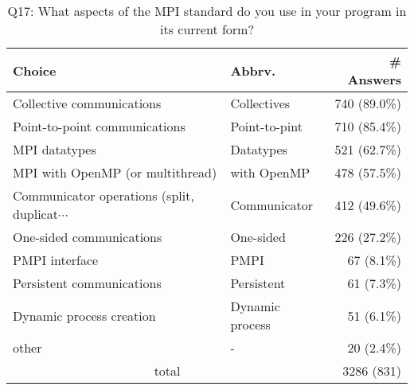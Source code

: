\begin{table}[htb]%
\begin{center}%
\caption{Q17: What aspects of the MPI standard do you use in your program in its current form?}%
\label{tab:Q17-ans}%
\begin{tabular}{l|l|r}%
\hline%
Choice & Abbrv. & \# Answers \\%
\hline%
Collective communications & Collectives & 740 (89.0\%) \\%
Point-to-point communications & Point-to-pint & 710 (85.4\%) \\%
MPI datatypes & Datatypes & 521 (62.7\%) \\%
MPI with OpenMP (or multithread) & with OpenMP & 478 (57.5\%) \\%
{\small Communicator operations (split, duplicat$\cdots$} & Communicator & 412 (49.6\%) \\%
One-sided communications & One-sided & 226 (27.2\%) \\%
PMPI interface & PMPI & 67 (8.1\%) \\%
Persistent communications & Persistent & 61 (7.3\%) \\%
Dynamic process creation & Dynamic process & 51 (6.1\%) \\%
other & - & 20 (2.4\%) \\%
\hline%
\multicolumn{2}{c}{total} & 3286 (831)\\%
\hline%
\end{tabular}%
\end{center}%
\end{table}%
